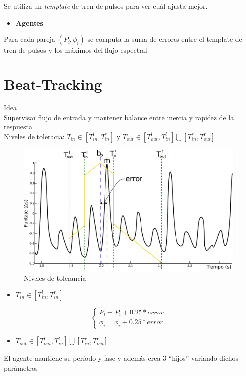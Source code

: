 \documentclass[12pt,a4paper,titlepage]{report}
\begin{document}
Se utiliza un \emph{template} de tren de pulsos para ver cuál ajusta mejor.\\[.5cm]
\begin{itemize} \item \textbf{Agentes} \end{itemize}
Para cada pareja $(P_i,\phi_i)$ se computa la suma de errores entre el template de tren de pulsos y los máximos del flujo espectral



\section*{Beat-Tracking}

Idea\\
Supervisar flujo de entrada y mantener balance entre inercia y rapidez de la respuesta\\

Niveles de toleracia: $T_{in}\in[T_{in}^l,T_{in}^r]$ y $T_{out}\in[T_{out}^l,T_{in}^l] \bigcup [T_{in}^r,T_{out}^r]$

\begin{figure}[h!]
  \begin{center}
  \vspace*{-10pt}
  \includegraphics[width=.8\textwidth]{./pics/graficamejor.png}
  \end{center}
  \vspace{-10pt}
  \caption{Niveles de tolerancia}
  \label{fig:grafica}
\end{figure}

\begin{itemize} \item \textbf{$T_{in}\in[T_{in}^l,T_{in}^r]$} \end{itemize}
$$
\begin{cases}
P_i = P_i+0.25*error\\
\phi_i = \phi_i+0.25*error
\end{cases}
$$
\begin{itemize} \item \textbf{$T_{out}\in[T_{out}^l,T_{in}^l] \bigcup [T_{in}^r,T_{out}^r]$} \end{itemize}
El agente mantiene su período y fase y además crea 3 ``hijos'' variando dichos parámetros\\
\end{document}
